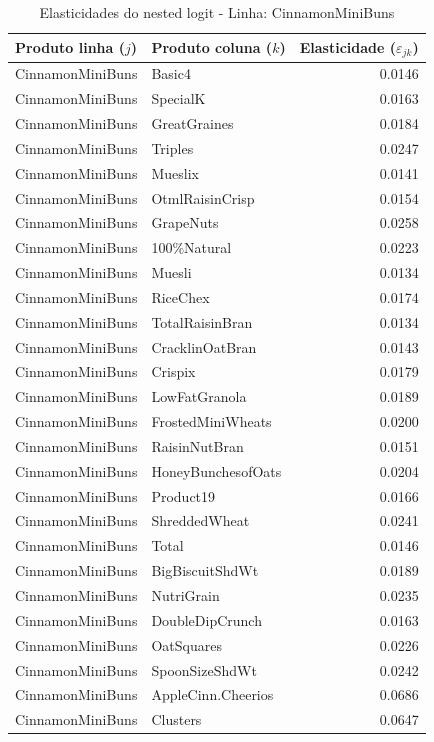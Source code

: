 \begingroup
\begin{table}[H]
\centering
\caption{Elasticidades do nested logit - Linha: CinnamonMiniBuns}
\label{tab:elas-nested-cinnamonminibuns}
\small
\begin{tabular}{llr}
\toprule
Produto linha ($j$) & Produto coluna ($k$) & Elasticidade ($\varepsilon_{jk}$) \\
\midrule
CinnamonMiniBuns & Basic4 & 0.0146 \\
CinnamonMiniBuns & SpecialK & 0.0163 \\
CinnamonMiniBuns & GreatGraines & 0.0184 \\
CinnamonMiniBuns & Triples & 0.0247 \\
CinnamonMiniBuns & Mueslix & 0.0141 \\
CinnamonMiniBuns & OtmlRaisinCrisp & 0.0154 \\
CinnamonMiniBuns & GrapeNuts & 0.0258 \\
CinnamonMiniBuns & 100\%Natural & 0.0223 \\
CinnamonMiniBuns & Muesli & 0.0134 \\
CinnamonMiniBuns & RiceChex & 0.0174 \\
CinnamonMiniBuns & TotalRaisinBran & 0.0134 \\
CinnamonMiniBuns & CracklinOatBran & 0.0143 \\
CinnamonMiniBuns & Crispix & 0.0179 \\
CinnamonMiniBuns & LowFatGranola & 0.0189 \\
CinnamonMiniBuns & FrostedMiniWheats & 0.0200 \\
CinnamonMiniBuns & RaisinNutBran & 0.0151 \\
CinnamonMiniBuns & HoneyBunchesofOats & 0.0204 \\
CinnamonMiniBuns & Product19 & 0.0166 \\
CinnamonMiniBuns & ShreddedWheat & 0.0241 \\
CinnamonMiniBuns & Total & 0.0146 \\
CinnamonMiniBuns & BigBiscuitShdWt & 0.0189 \\
CinnamonMiniBuns & NutriGrain & 0.0235 \\
CinnamonMiniBuns & DoubleDipCrunch & 0.0163 \\
CinnamonMiniBuns & OatSquares & 0.0226 \\
CinnamonMiniBuns & SpoonSizeShdWt & 0.0242 \\
CinnamonMiniBuns & AppleCinn.Cheerios & 0.0686 \\
CinnamonMiniBuns & Clusters & 0.0647 \\

\end{tabular}
\end{table}
